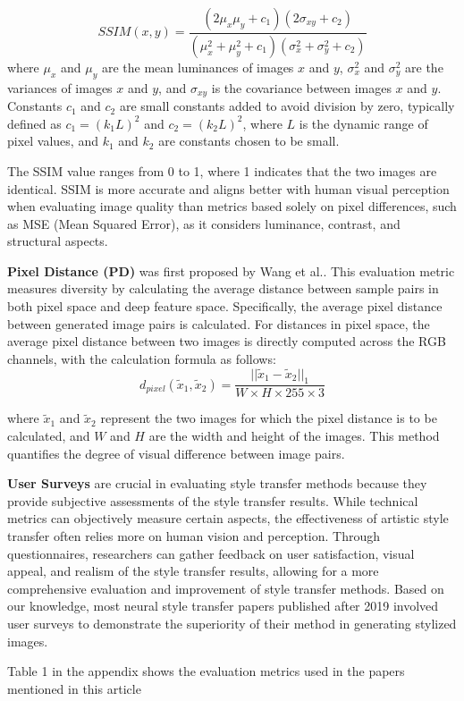 \begin{equation}
    SSIM(x, y) = \frac{(2\mu_x\mu_y + c_1)(2\sigma_{xy} + c_2)}{(\mu_x^2 + \mu_y^2 + c_1)(\sigma_x^2 + \sigma_y^2 + c_2)}
\end{equation}
where $\mu_x$ and $\mu_y$ are the mean luminances of images $x$ and $y$, $\sigma_x^2$ and $\sigma_y^2$ are the variances of images $x$ and $y$, and $\sigma_{xy}$ is the covariance between images $x$ and $y$. Constants $c_1$ and $c_2$ are small constants added to avoid division by zero, typically defined as $c_1=(k_1 L)^2$ and $c_2=(k_2 L)^2$, where $L$ is the dynamic range of pixel values, and $k_1$ and $k_2$ are constants chosen to be small.

The SSIM value ranges from 0 to 1, where 1 indicates that the two images are identical. SSIM is more accurate and aligns better with human visual perception when evaluating image quality than metrics based solely on pixel differences, such as MSE (Mean Squared Error), as it considers luminance, contrast, and structural aspects.

\textbf{Pixel Distance (PD)} was first proposed by Wang et al.\citep{76wang2020diversified}. This evaluation metric measures diversity by calculating the average distance between sample pairs in both pixel space and deep feature space. Specifically, the average pixel distance between generated image pairs is calculated. For distances in pixel space, the average pixel distance between two images is directly computed across the RGB channels, with the calculation formula as follows:
\begin{equation}
    d_{pixel}(\tilde{x}_1, \tilde{x}_2) = \frac{||\tilde{x}_1 - \tilde{x}_2||_1}{W \times H \times 255 \times 3}
\end{equation}

where $\tilde{x}_1$ and $\tilde{x}_2$ represent the two images for which the pixel distance is to be calculated, and $W$ and $H$ are the width and height of the images. This method quantifies the degree of visual difference between image pairs.

\textbf{User Surveys} are crucial in evaluating style transfer methods because they provide subjective assessments of the style transfer results. While technical metrics can objectively measure certain aspects, the effectiveness of artistic style transfer often relies more on human vision and perception. Through questionnaires, researchers can gather feedback on user satisfaction, visual appeal, and realism of the style transfer results, allowing for a more comprehensive evaluation and improvement of style transfer methods. Based on our knowledge, most neural style transfer papers published after 2019 involved user surveys to demonstrate the superiority of their method in generating stylized images.

Table 1 in the appendix shows the evaluation metrics used in the papers mentioned in this article
